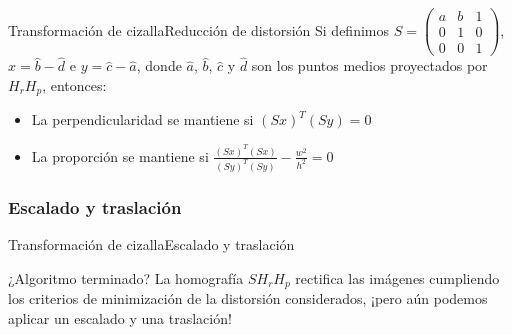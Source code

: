 \documentclass[aspectratio=169,14pt,spanish]{beamer}
\begin{document}
          \begin{frame}{Transformación de cizalla}{Reducción de distorsión}
              Si definimos $S = \begin{pmatrix}
                  a & b & 1\\
                  0 & 1 & 0\\
                  0 & 0 & 1
              \end{pmatrix}$, $x = \hat{b} - \hat{d}$ e $y = \hat{c} - \hat{a}$, donde $\hat{a}$, $\hat{b}$, $\hat{c}$ y $\hat{d}$ son los puntos medios proyectados por $H_r H_p$, entonces:

              \begin{itemize}
                  \item<2-> La perpendicularidad se mantiene si $(Sx)^T (Sy) = 0$
                  \item<3-> La proporción se mantiene si $\frac{(Sx)^T (Sx)}{(Sy)^T (Sy)} - \frac{w^2}{h^2} = 0$
              \end{itemize}

          \end{frame}

        \subsubsection{Escalado y traslación}
          \begin{frame}{Transformación de cizalla}{Escalado y traslación}
              \begin{alertblock}{¿Algoritmo terminado?}
                  La homografía $S H_r H_p$ rectifica las imágenes cumpliendo los criterios de minimización de la distorsión considerados, ¡pero aún podemos aplicar un escalado y una traslación!
              \end{alertblock}

          \end{frame}
\end{document}

